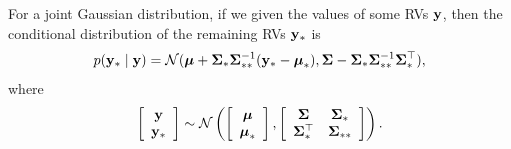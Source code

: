 \begin{property}
	For a joint Gaussian distribution, if we given the values of some RVs $\mathbf{y}$, then the conditional distribution of the remaining RVs $\mathbf{y}_*$ is
	$$
	p(\mathbf{y}_* \mid \mathbf{y}) = \mathcal{N}(\boldsymbol{\mu} + \mathbf{\Sigma}_* \mathbf{\Sigma}_{**}^{-1}(\mathbf{y}_* - \boldsymbol{\mu}_*), \mathbf{\Sigma} - \mathbf{\Sigma}_* \mathbf{\Sigma}_{**}^{-1}\mathbf{\Sigma}_*^\top ),
	$$
	where
	$$
\left[\begin{array}{c}
\mathbf{y} \\
\mathbf{y}_*
\end{array}\right] 
\sim \mathcal{N}\left(\left[\begin{array}{c}
\boldsymbol{\mu} \\
\boldsymbol{\mu}_*
\end{array}\right], \left[\begin{array}{cc}
\mathbf{\Sigma} & \mathbf{\Sigma}_* \\
\mathbf{\Sigma}_*^\top & \mathbf{\Sigma}_{**}
\end{array}\right]\right).
	$$
\end{property}
